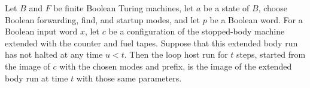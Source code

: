 \begin{lemma}
\label{Turing.FinTM.loopHost_body_run}
\leanok
{}
Let $B$ and $F$ be finite Boolean Turing machines, let $a$ be a state of $B$, choose
Boolean forwarding, find, and startup modes, and let $p$ be a Boolean word. For a
Boolean input word $x$, let $c$ be a configuration of the stopped-body machine extended
with the counter and fuel tapes. Suppose that this extended body run has not halted at
any time $u<t$. Then the loop host run for $t$ steps, started from the image of $c$ with
the chosen modes and prefix, is the image of the extended body run at time $t$ with
those same parameters.
\end{lemma}

